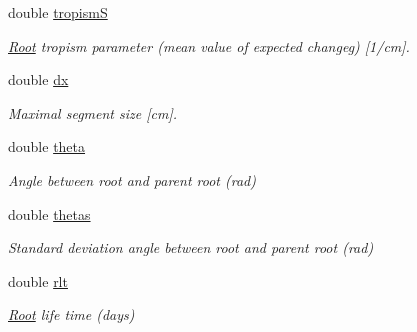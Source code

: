 \begin{DoxyCompactItemize}
\mbox{\label{classCPlantBox_1_1StemRandomOrganParameter_a7f46c00285034cfb7e304323dd511347}} 
double \hyperlink{classCPlantBox_1_1StemRandomOrganParameter_a7f46c00285034cfb7e304323dd511347}{tropismS}
\begin{DoxyCompactList}\small\item\em \hyperlink{classCPlantBox_1_1Root}{Root} tropism parameter (mean value of expected changeg) \mbox{[}1/cm\mbox{]}. \end{DoxyCompactList}\item 
\mbox{\label{classCPlantBox_1_1StemRandomOrganParameter_aa2216d0b46b69eb5ac2f4ca1b1a0cb06}} 
double \hyperlink{classCPlantBox_1_1StemRandomOrganParameter_aa2216d0b46b69eb5ac2f4ca1b1a0cb06}{dx}
\begin{DoxyCompactList}\small\item\em Maximal segment size \mbox{[}cm\mbox{]}. \end{DoxyCompactList}\item 
\mbox{\label{classCPlantBox_1_1StemRandomOrganParameter_aaea467eca2eec27ca26c659a79b5e03a}} 
double \hyperlink{classCPlantBox_1_1StemRandomOrganParameter_aaea467eca2eec27ca26c659a79b5e03a}{theta}
\begin{DoxyCompactList}\small\item\em Angle between root and parent root (rad) \end{DoxyCompactList}\item 
\mbox{\label{classCPlantBox_1_1StemRandomOrganParameter_acfbc9c8726805117a0263a003fd7e92c}} 
double \hyperlink{classCPlantBox_1_1StemRandomOrganParameter_acfbc9c8726805117a0263a003fd7e92c}{thetas}
\begin{DoxyCompactList}\small\item\em Standard deviation angle between root and parent root (rad) \end{DoxyCompactList}\item 
\mbox{\label{classCPlantBox_1_1StemRandomOrganParameter_a30a9896019f04a7e7c8dd6a1cc981d6a}} 
double \hyperlink{classCPlantBox_1_1StemRandomOrganParameter_a30a9896019f04a7e7c8dd6a1cc981d6a}{rlt}
\begin{DoxyCompactList}\small\item\em \hyperlink{classCPlantBox_1_1Root}{Root} life time (days) \end{DoxyCompactList}\item 

\end{DoxyCompactItemize}
